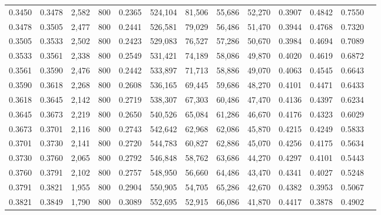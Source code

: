 \begin{tabular}{rrrrrrrrrrrrr}
0.3450 & 0.3478 &  2,582 &   800 &                                     0.2365 & 524,104 &  81,506 &  55,686 &  52,270 & 0.3907 & 0.4842 & 0.7550 \\
0.3478 & 0.3505 &  2,477 &   800 &                                     0.2441 & 526,581 &  79,029 &  56,486 &  51,470 & 0.3944 & 0.4768 & 0.7320 \\
0.3505 & 0.3533 &  2,502 &   800 &                                     0.2423 & 529,083 &  76,527 &  57,286 &  50,670 & 0.3984 & 0.4694 & 0.7089 \\
0.3533 & 0.3561 &  2,338 &   800 &                                     0.2549 & 531,421 &  74,189 &  58,086 &  49,870 & 0.4020 & 0.4619 & 0.6872 \\
0.3561 & 0.3590 &  2,476 &   800 &                                     0.2442 & 533,897 &  71,713 &  58,886 &  49,070 & 0.4063 & 0.4545 & 0.6643 \\
0.3590 & 0.3618 &  2,268 &   800 &                                     0.2608 & 536,165 &  69,445 &  59,686 &  48,270 & 0.4101 & 0.4471 & 0.6433 \\
0.3618 & 0.3645 &  2,142 &   800 &                                     0.2719 & 538,307 &  67,303 &  60,486 &  47,470 & 0.4136 & 0.4397 & 0.6234 \\
0.3645 & 0.3673 &  2,219 &   800 &                                     0.2650 & 540,526 &  65,084 &  61,286 &  46,670 & 0.4176 & 0.4323 & 0.6029 \\
0.3673 & 0.3701 &  2,116 &   800 &                                     0.2743 & 542,642 &  62,968 &  62,086 &  45,870 & 0.4215 & 0.4249 & 0.5833 \\
0.3701 & 0.3730 &  2,141 &   800 &                                     0.2720 & 544,783 &  60,827 &  62,886 &  45,070 & 0.4256 & 0.4175 & 0.5634 \\
0.3730 & 0.3760 &  2,065 &   800 &                                     0.2792 & 546,848 &  58,762 &  63,686 &  44,270 & 0.4297 & 0.4101 & 0.5443 \\
0.3760 & 0.3791 &  2,102 &   800 &                                     0.2757 & 548,950 &  56,660 &  64,486 &  43,470 & 0.4341 & 0.4027 & 0.5248 \\
0.3791 & 0.3821 &  1,955 &   800 &                                     0.2904 & 550,905 &  54,705 &  65,286 &  42,670 & 0.4382 & 0.3953 & 0.5067 \\
0.3821 & 0.3849 &  1,790 &   800 &                                     0.3089 & 552,695 &  52,915 &  66,086 &  41,870 & 0.4417 & 0.3878 & 0.4902 \\

\end{tabular}

